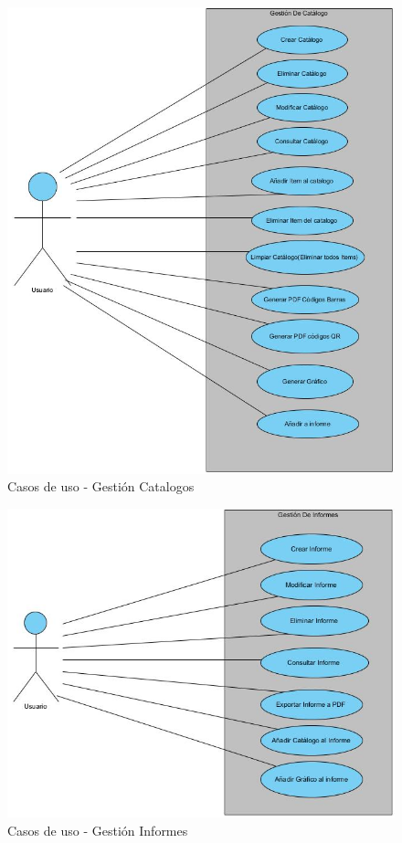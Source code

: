 \documentclass[a4paper,11pt]{book}
\begin{document}
\begin{figure}[H] 
\centering 
\includegraphics[scale=0.50]{imagenes/casosUso/gestionCatalogo.jpg}
\caption{ Casos de uso - Gestión Catalogos  }  
\end{figure}


\begin{figure}[H] 
\centering 
\includegraphics[scale=0.50]{imagenes/casosUso/Informe.jpg}
\caption{ Casos de uso - Gestión Informes  }  
\end{figure}
\end{document}
